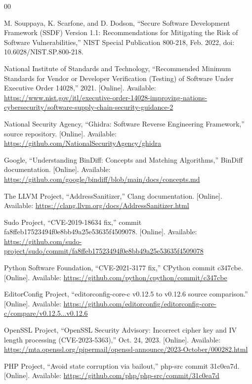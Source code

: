 \documentclass[conference]{IEEEtran}
\begin{document}
\begin{thebibliography}{00}

M. Souppaya, K. Scarfone, and D. Dodson, ``Secure Software Development Framework (SSDF) Version 1.1: Recommendations for Mitigating the Risk of Software Vulnerabilities,'' NIST Special Publication 800-218, Feb. 2022, doi: 10.6028/NIST.SP.800-218.

National Institute of Standards and Technology, ``Recommended Minimum Standards for Vendor or Developer Verification (Testing) of Software Under Executive Order 14028,'' 2021. [Online]. Available: \url{https://www.nist.gov/itl/executive-order-14028-improving-nations-cybersecurity/software-supply-chain-security-guidance-2}

National Security Agency, ``Ghidra: Software Reverse Engineering Framework,'' source repository. [Online]. Available: \url{https://github.com/NationalSecurityAgency/ghidra}

Google, ``Understanding BinDiff: Concepts and Matching Algorithms,'' BinDiff documentation. [Online]. Available: \url{https://github.com/google/bindiff/blob/main/docs/concepts.md}

The LLVM Project, ``AddressSanitizer,'' Clang documentation. [Online]. Available: \url{https://clang.llvm.org/docs/AddressSanitizer.html}

Sudo Project, ``CVE-2019-18634 fix,'' commit fa8ffeb17523494f0e8bb49a25e53635f4509078. [Online]. Available: \url{https://github.com/sudo-project/sudo/commit/fa8ffeb17523494f0e8bb49a25e53635f4509078}

Python Software Foundation, ``CVE-2021-3177 fix,'' CPython commit c347cbe. [Online]. Available: \url{https://github.com/python/cpython/commit/c347cbe}

EditorConfig Project, ``editorconfig-core-c v0.12.5 to v0.12.6 source comparison.'' [Online]. Available: \url{https://github.com/editorconfig/editorconfig-core-c/compare/v0.12.5...v0.12.6}

OpenSSL Project, ``OpenSSL Security Advisory: Incorrect cipher key and IV length processing (CVE-2023-5363),'' Oct. 24, 2023. [Online]. Available: \url{https://mta.openssl.org/pipermail/openssl-announce/2023-October/000282.html}

PHP Project, ``Avoid state corruption via bailout,'' php-src commit 31c0ea7d. [Online]. Available: \url{https://github.com/php/php-src/commit/31c0ea7d}

\end{thebibliography}
\end{document}
